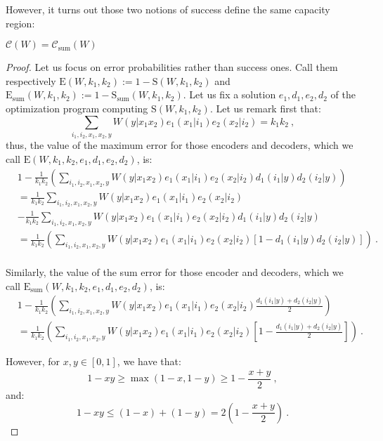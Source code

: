 However, it turns out those two notions of success define the same capacity region:
\begin{proposition}
  \label{prop:CapaSumJoint}
  $\mathcal{C}(W) = \mathcal{C}_{\text{sum}}(W)$
\end{proposition}
\begin{proof}
  Let us focus on error probabilities rather than success ones. Call them respectively $\mathrm{E}(W,k_1,k_2) := 1-\mathrm{S}(W,k_1,k_2)$ and $\mathrm{E}_{\text{sum}}(W,k_1,k_2) := 1-\mathrm{S}_{\text{sum}}(W,k_1,k_2)$. Let us fix a solution $e_1,d_1,e_2,d_2$ of the optimization program computing $\mathrm{S}(W,k_1,k_2)$. Let us remark first that:
  \[ \sum_{i_1,i_2,x_1,x_2,y} W(y|x_1x_2)e_1(x_1|i_1)e_2(x_2|i_2) = k_1k_2\ , \]
  thus, the value of the maximum error for those encoders and decoders, which we call $\mathrm{E}(W,k_1,k_2,e_1,d_1,e_2,d_2)$, is:
\begin{equation}
  \begin{aligned}
    & 1 -  \frac{1}{k_1k_2}\left(\sum_{i_1,i_2,x_1,x_2,y} W(y|x_1x_2)e_1(x_1|i_1)e_2(x_2|i_2)d_1(i_1|y)d_2(i_2|y)\right)\\
    &=\frac{1}{k_1k_2}\sum_{i_1,i_2,x_1,x_2,y} W(y|x_1x_2)e_1(x_1|i_1)e_2(x_2|i_2)\\
    &-\frac{1}{k_1k_2}\sum_{i_1,i_2,x_1,x_2,y} W(y|x_1x_2)e_1(x_1|i_1)e_2(x_2|i_2)d_1(i_1|y)d_2(i_2|y)\\
    &=\frac{1}{k_1k_2}\left(\sum_{i_1,i_2,x_1,x_2,y} W(y|x_1x_2)e_1(x_1|i_1)e_2(x_2|i_2)\left[1-d_1(i_1|y)d_2(i_2|y)\right]\right) \ .\\
  \end{aligned}
\end{equation}

Similarly, the value of the sum error for those encoder and decoders, which we call $\mathrm{E}_{\text{sum}}(W,k_1,k_2,e_1,d_1,e_2,d_2)$, is:
\begin{equation}
  \begin{aligned}
    &1 -  \frac{1}{k_1k_2}\left(\sum_{i_1,i_2,x_1,x_2,y} W(y|x_1x_2)e_1(x_1|i_1)e_2(x_2|i_2)\frac{d_1(i_1|y)+d_2(i_2|y)}{2}\right)\\
    &= \frac{1}{k_1k_2}\left(\sum_{i_1,i_2,x_1,x_2,y} W(y|x_1x_2)e_1(x_1|i_1)e_2(x_2|i_2)\left[1-\frac{d_1(i_1|y)+d_2(i_2|y)}{2}\right]\right) \ .
  \end{aligned}
\end{equation}

However, for $x,y \in [0,1]$, we have that:
\[1-xy \geq \max\left(1-x,1-y\right) \geq 1-\frac{x+y}{2} \ , \]
and:
\[1-xy \leq (1-x) + (1-y) = 2  \left(1-\frac{x+y}{2}\right) \ . \]


\end{proof}
